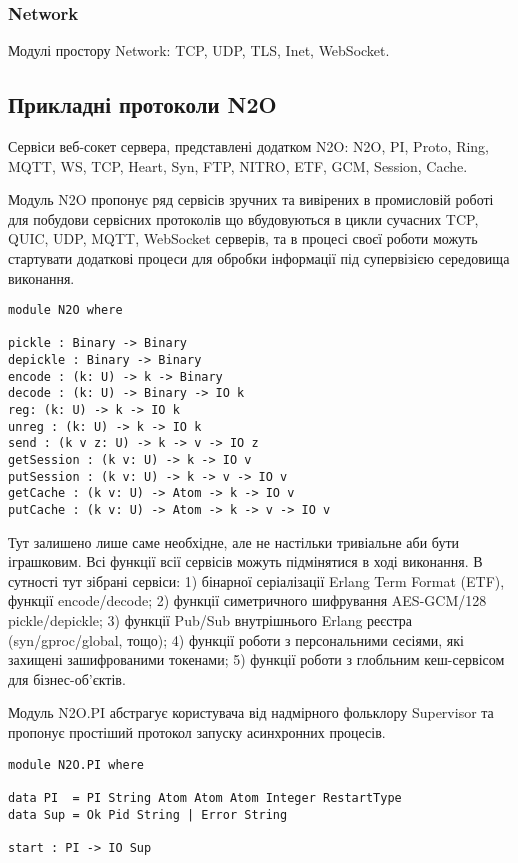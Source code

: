 \subsubsection{Network}
Модулі простору Network: TCP, UDP, TLS, Inet, WebSocket.

\newpage
\subsection{Прикладні протоколи N2O}
Сервіси веб-сокет сервера, представлені додатком N2O: N2O, PI, Proto,
Ring, MQTT, WS, TCP, Heart, Syn, FTP, NITRO, ETF, GCM, Session, Cache.

Модуль N2O пропонує ряд сервісів зручних та вивірених в промисловій роботі для побудови
сервісних протоколів що вбудовуються в цикли сучасних TCP, QUIC, UDP, MQTT, WebSocket серверів,
та в процесі своєї роботи можуть стартувати додаткові процеси для обробки інформації під
супервізією середовища виконання.

\begin{lstlisting}
module N2O where

pickle : Binary -> Binary
depickle : Binary -> Binary
encode : (k: U) -> k -> Binary
decode : (k: U) -> Binary -> IO k
reg: (k: U) -> k -> IO k
unreg : (k: U) -> k -> IO k
send : (k v z: U) -> k -> v -> IO z
getSession : (k v: U) -> k -> IO v
putSession : (k v: U) -> k -> v -> IO v
getCache : (k v: U) -> Atom -> k -> IO v
putCache : (k v: U) -> Atom -> k -> v -> IO v
\end{lstlisting}

Тут залишено лише саме необхідне, але не настільки тривіальне аби бути іграшковим.
Всі функції всії сервісів можуть підмінятися в ході виконання.
В сутності тут зібрані сервіси:
1) бінарної серіалізації Erlang Term Format (ETF), функції encode/decode;
2) функції симетричного шифрування AES-GCM/128 pickle/depickle;
3) функції Pub/Sub внутрішнього Erlang реєстра (syn/gproc/global, тощо);
4) функції роботи з персональними сесіями, які захищені зашифрованими токенами;
5) функції роботи з глобльним кеш-сервісом для бізнес-об'єктів.

Модуль N2O.PI абстрагує користувача від надмірного
фольклору Supervisor та пропонує простіший протокол запуску
асинхронних процесів.

\begin{lstlisting}
module N2O.PI where

data PI  = PI String Atom Atom Atom Integer RestartType
data Sup = Ok Pid String | Error String

start : PI -> IO Sup
\end{lstlisting}

